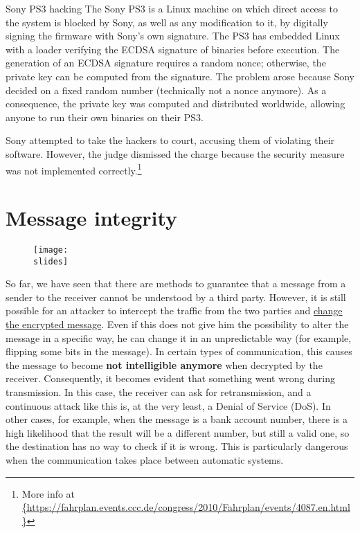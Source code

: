 \begin{casehistory}{Sony PS3 hacking}
    The Sony PS3 is a Linux machine on which direct access to the system is blocked by Sony, as well as any modification to it, by digitally signing the firmware with Sony's own signature. The PS3 has embedded Linux with a loader verifying the ECDSA signature of binaries before execution. The generation of an ECDSA signature requires a random nonce; otherwise, the private key can be computed from the signature. The problem arose because Sony decided on a fixed random number (technically not a nonce anymore). As a consequence, the private key was computed and distributed worldwide, allowing anyone to run their own binaries on their PS3.

    Sony attempted to take the hackers to court, accusing them of violating their software. However, the judge dismissed the charge because the security measure was not implemented correctly.\footnote{More info at \url{{https://fahrplan.events.ccc.de/congress/2010/Fahrplan/events/4087.en.html}}}
\end{casehistory}


\section{Message integrity}
\begin{figure}[h]
    \centering
    \texttt{[image: \\slides]}
\end{figure}

So far, we have seen that there are methods to guarantee that a message from a sender to the receiver cannot be understood by a third party. However, it is still possible for an attacker to intercept the traffic from the two parties and \underline{change the encrypted message}.
Even if this does not give him the possibility to alter the message in a specific way, he can change it in an unpredictable way (for example, flipping some bits in the message).
In certain types of communication, this causes the message to become \textbf{not intelligible anymore} when decrypted by the receiver.
Consequently, it becomes evident that something went wrong during transmission. In this case, the receiver can ask for retransmission, and a continuous attack like this is, at the very least, a Denial of Service (DoS).
In other cases, for example, when the message is a bank account number, there is a high likelihood that the result will be a different number, but still a valid one, so the destination has no way to check if it is wrong.
This is particularly dangerous when the communication takes place between automatic systems.

